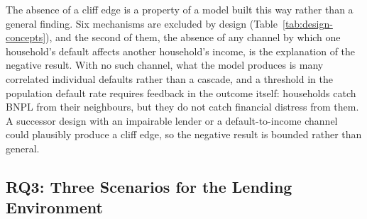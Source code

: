 \label{sec:no-cascade}
The absence of a cliff edge is a property of a model built this way rather than a general finding.
Six mechanisms are excluded by design (Table~\ref{tab:design-concepts}), and the second of them, the absence of any channel by which one household's default affects another household's income, is the explanation of the negative result.
With no such channel, what the model produces is many correlated individual defaults rather than a cascade, and a threshold in the population default rate requires feedback in the outcome itself: households catch \ac{BNPL} from their neighbours, but they do not catch financial distress from them.
A successor design with an impairable lender or a default-to-income channel could plausibly produce a cliff edge, so the negative result is bounded rather than general.

\subsection{RQ3: Three Scenarios for the Lending Environment}
\label{sec:results-rq3}

